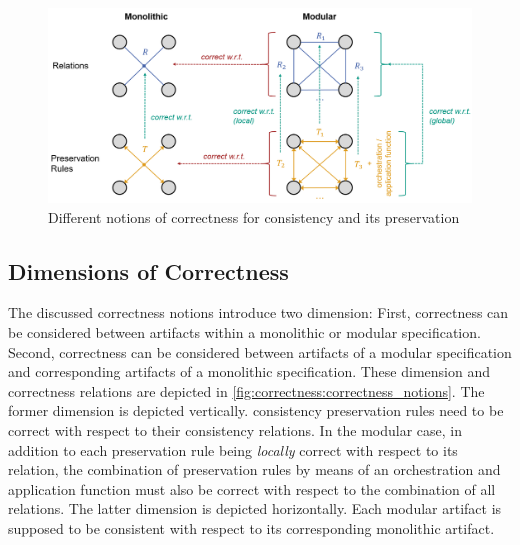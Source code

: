 \begin{figure}
    \centering
    \includegraphics[width=\textwidth]{figures/correctness/formal/correctness_notions.png}
    \caption[Notions of correctness for consistency and its preservation]{Different notions of correctness for consistency and its preservation}
    \label{fig:correctness:correctness_notions}
\end{figure}


\subsection{Dimensions of Correctness}
\label{chap:correctness:notions:dimensions}

The discussed correctness notions introduce two dimension: First, correctness can be considered between artifacts within a monolithic or modular specification. Second, correctness can be considered between artifacts of a modular specification and corresponding artifacts of a monolithic specification. These dimension and correctness relations are depicted in \autoref{fig:correctness:correctness_notions}.
The former dimension is depicted vertically. \Glspl{consistency preservation rule} need to be correct with respect to their \glspl{consistency relation}.
In the modular case, in addition to each preservation rule being \emph{locally} correct with respect to its relation, the combination of preservation rules by means of an orchestration and application function must also be correct with respect to the combination of all relations.
The latter dimension is depicted horizontally. Each modular artifact is supposed to be consistent with respect to its corresponding monolithic artifact.

